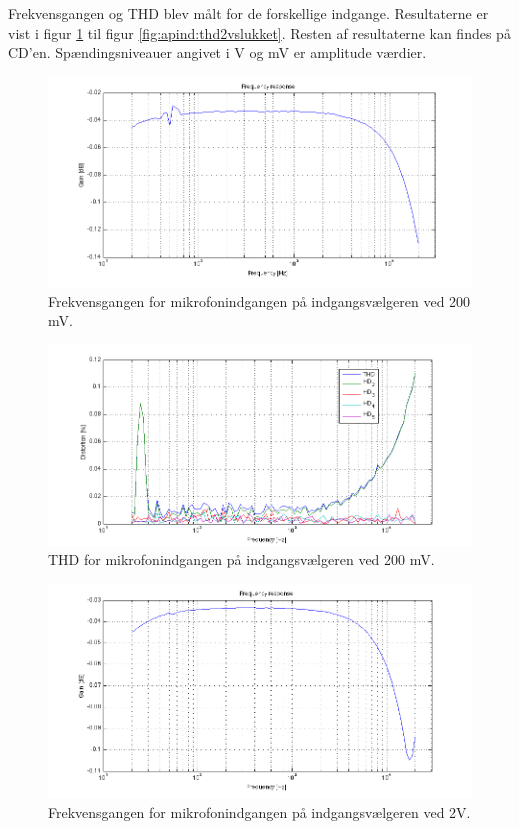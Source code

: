 Frekvensgangen og THD blev målt for de forskellige indgange. Resultaterne er vist i figur \ref{fig:apind:frek200mv} til figur \ref{fig:apind:thd2vslukket}. Resten af resultaterne kan findes på CD'en. Spændingsniveauer angivet i V og mV er amplitude værdier. 


\begin{figure}[h]
\centering
\includegraphics[width=\textwidth]{maalerapporter/indgangsvaelger/Indgangsvlger mic 200mv frek.png}
\caption{Frekvensgangen for mikrofonindgangen på indgangsvælgeren ved 200 mV.}
\label{fig:apind:frek200mv}
\end{figure}


\begin{figure}[h]
\centering
\includegraphics[width=\textwidth]{maalerapporter/indgangsvaelger/Indgangsvlger mic 200mv thd.png}
\caption{THD for mikrofonindgangen på indgangsvælgeren ved 200 mV.}
\label{fig:apind:thd200mv}
\end{figure}


\begin{figure}[h]
\centering
\includegraphics[width=\textwidth]{maalerapporter/indgangsvaelger/Indgangsvlger mic 2v frek.png}
\caption{Frekvensgangen for mikrofonindgangen på indgangsvælgeren ved 2V.}
\label{fig:apind:frek2v}
\end{figure}


